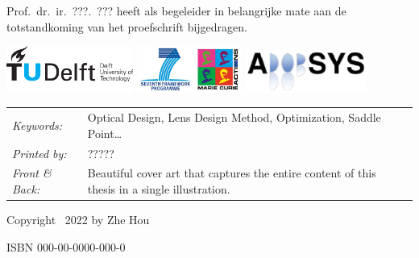 \begin{titlepage}
\medskip
\noindent Prof.\ dr.\ ir.\ ???.\ ??? heeft als begeleider in belangrijke mate aan de totstandkoming van het proefschrift bijgedragen.

\vfill
\begin{center}
    \includegraphics[height=0.6in]{title/logos/tudelftpng}
    \hspace{2em}
    \includegraphics[height=0.6in]{title/logos/marie-curie}
    \hspace{2em}
    \includegraphics[height=0.55in]{title/logos/adopsys}
\end{center}
\vfill

\noindent
\begin{tabular}{@{}p{}@{}p{}}
    \textit{Keywords:} & Optical Design, Lens Design Method, Optimization, Saddle Point\ldots \\[\medskipamount]
    \textit{Printed by:} & ????? \\[\medskipamount]
    \textit{Front \& Back:} & Beautiful cover art that captures the entire content of this thesis in a single illustration.
\end{tabular}

\vspace{4\bigskipamount}

\noindent Copyright \textcopyright\ 2022 by Zhe Hou


\medskip
\noindent ISBN 000-00-0000-000-0


\end{titlepage}
